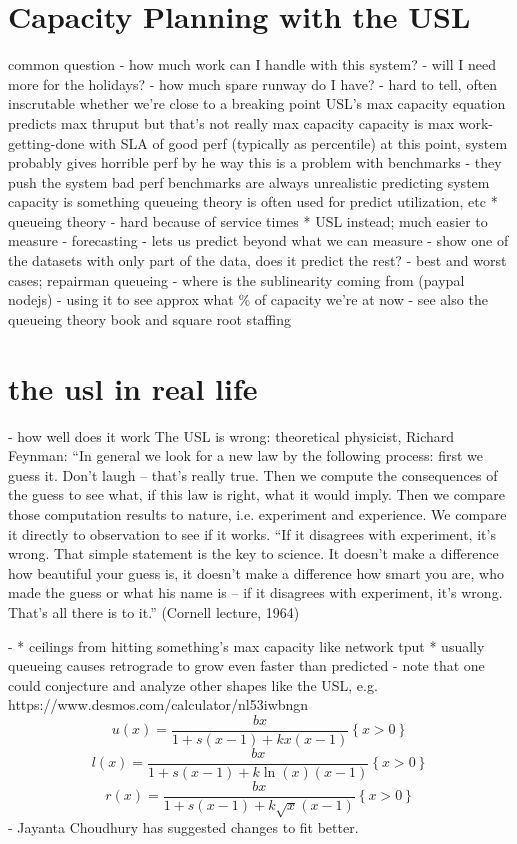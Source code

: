 \documentclass{vivid_layout}
\begin{document}
\section{Capacity Planning with the USL}
  common question - how much work can I handle with this system?
  - will I need more for the holidays?
  - how much spare runway do I have?
  - hard to tell, often inscrutable whether we're close to a breaking point
  USL's max capacity equation predicts max thruput
  but that's not really max capacity
  capacity  is max work-getting-done with SLA of good perf (typically as percentile)
  at this point, system probably gives horrible perf
	 by he way this is a problem with benchmarks - they push the system bad perf
	 benchmarks are always unrealistic
	predicting system capacity is something queueing theory is often used for
	predict utilization, etc
 * queueing theory - hard because of service times
	  * USL instead; much easier to measure
  - forecasting - lets us predict beyond what we can measure
  - show one of the datasets with only part of the data, does it predict the
  rest?
  - best and worst cases; repairman queueing
  - where is the sublinearity coming from (paypal nodejs)
  - using it to see approx what \% of capacity we're at now
  - see also the queueing theory book and square root staffing

\section{the usl in real life}
  - how well does it work
	The USL is wrong:
	theoretical physicist, Richard Feynman:
	“In general we look for a new law by the following process: first we guess it.
	Don’t laugh -- that’s really true. Then we compute the consequences of the guess
	to see what, if this law is right, what it would imply. Then we compare those
	computation results to nature, i.e. experiment and experience. We compare it
	directly to observation to see if it works.
	“If it disagrees with experiment, it’s wrong. That simple statement is the key
	to science. It doesn’t make a difference how beautiful your guess is, it doesn’t
	make a difference how smart you are, who made the guess or what his name is --
	if it disagrees with experiment, it’s wrong. That’s all there is to it.”
	(Cornell lecture, 1964)

  - 
      * ceilings from hitting something’s max capacity like network tput
		    * usually queueing causes retrograde to grow even faster than
			 predicted
	- note that one could conjecture and analyze other shapes like the USL, e.g.
	https://www.desmos.com/calculator/nl53iwbngn
	\[
	u\left(x\right)=\frac{bx}{1+s\left(x-1\right)+kx\left(x-1\right)}\left\{x>0\right\}
	\]
	\[
	l\left(x\right)=\frac{bx}{1+s\left(x-1\right)+k\ln\left(x\right)\left(x-1\right)}\left\{x>0\right\}
	\]
	\[
	r\left(x\right)=\frac{bx}{1+s\left(x-1\right)+k\sqrt{x}\left(x-1\right)}\left\{x>0\right\}
	\]
	- Jayanta Choudhury has suggested changes to fit better.
\end{document}
